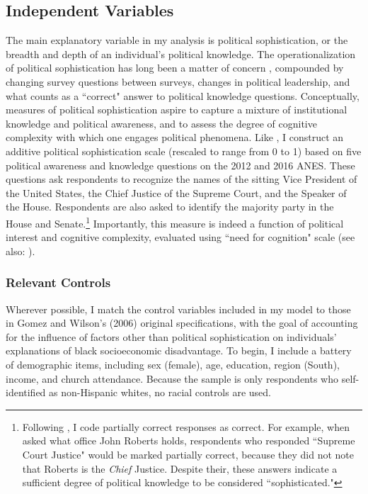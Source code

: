 \documentclass[12pt]{paper}
\begin{document}
\subsection{Independent Variables}
The main explanatory variable in my analysis is political sophistication, or the breadth and depth of an individual's political knowledge. The operationalization of political sophistication has long been a matter of concern \citep{luskin_measuring_1987}, compounded by changing survey questions between surveys, changes in political leadership, and what counts as a ``correct" answer to political knowledge questions. Conceptually, measures of political sophistication aspire to capture a mixture of institutional knowledge and political awareness, and to assess the degree of cognitive complexity with which one engages political phenomena. Like \cite{gomez_rethinking_2006}, I construct an additive political sophistication scale (rescaled to range from 0 to 1) based on five political awareness and knowledge questions on the 2012 and 2016 ANES. These questions ask respondents to recognize the names of the sitting Vice President of the United States, the Chief Justice of the Supreme Court, and the Speaker of the House. Respondents are also asked to identify the majority party in the House and Senate.\footnote{Following \cite{gomez_rethinking_2006}, I code partially correct responses as correct. For example, when asked what office John Roberts holds, respondents who responded ``Supreme Court Justice" would be marked partially correct, because they did not note that Roberts is the \textit{Chief} Justice. Despite their, these answers indicate a sufficient degree of political knowledge to be considered ``sophisticated."} Importantly, this measure is indeed a function of political interest and cognitive complexity, evaluated using \cite{cacioppo_dispositional_1996} ``need for cognition" scale (see also: \cite{gomez_cognitive_2006}).

\subsubsection{Relevant Controls}
Wherever possible, I match the control variables included in my model to those in Gomez and Wilson's (2006) original specifications, with the goal of accounting for the influence of factors other than political sophistication on individuals' explanations of black socioeconomic disadvantage. To begin, I include a battery of demographic items, including sex (female), age, education, region (South), income, and church attendance. Because the sample is only respondents who self-identified as non-Hispanic whites, no racial controls are used.
\end{document}
